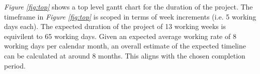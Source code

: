 \documentclass[11pt]{article}
\begin{document}

\textit{Figure \ref{fig:top}} shows a top level gantt chart for the duration of
the project. The timeframe in \textit{Figure \ref{fig:top}} is scoped in terms
of week increments (i.e. 5 working days each). The expected duration of the
project of 13 working weeks is equivilent to 65 working days. Given an expected
average working rate of 8 working days per calendar month, an overall estimate
of the expected timeline can be calculated at around 8 months. This aligns with
the chosen completion period.
\end{document}
